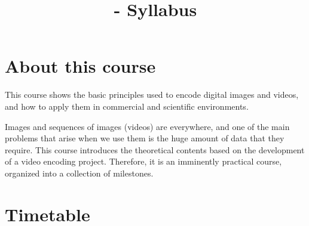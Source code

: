 
\title{\SM - Syllabus}

\maketitle

\section{About this course}

This course shows the basic principles used to encode digital images
and videos, and how to apply them in commercial and scientific
environments.

Images and sequences of images (videos) are everywhere, and one of the
main problems that arise when we use them is the huge amount of data
that they require. This course introduces the theoretical contents
based on the development of a video encoding project. Therefore, it is
an imminently practical course, organized into a collection of
milestones.

\section{Timetable}

